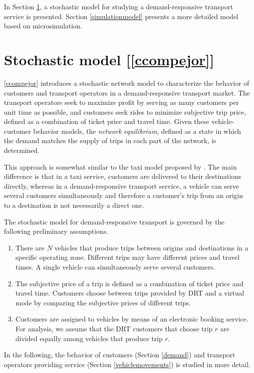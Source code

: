 \documentclass[dissertation,draft*]{aaltoseries}
\begin{document}
In Section \ref{networkmodel}, a stochastic model for studying a demand-responsive transport service is presented.
Section \ref{simulationmodel} presents a more detailed model based on microsimulation.

\section{Stochastic model [\ref{ccompejor}]}
\label{networkmodel}
\ref{ccompejor} introduces a stochastic network model to characterize the 
behavior of customers and transport operators in a demand-responsive transport market.
The transport operators seek to maximize profit by serving as many customers per unit time as possible, 
and customers seek rides to minimize subjective trip price, defined as a combination of ticket price and travel time. 
Given these vehicle-customer behavior models,
the \emph{network equilibrium}, defined as a state in which the demand matches the supply
of trips in each part of the network, is determined. 

This approach is somewhat similar to the taxi model proposed by \cite{yang2010}. The main difference is that in a taxi service, 
customers are delivered to their destinations directly, whereas in a demand-responsive transport service, a vehicle can serve several customers 
simultaneously and therefore a customer's trip from an origin to a destination is not necessarily a direct one. 

The stochastic model for demand-responsive transport is governed by the following preliminary assumptions.
\begin{enumerate}
\item
There are $N$ vehicles that produce trips between 
origins and destinations in a specific operating zone. 
Different trips may have different prices and
travel times. A single vehicle can simultaneously serve several customers.
\item
The subjective price of a trip is defined as a combination of ticket price and travel time.
Customers choose between trips provided by 
DRT and a virtual mode by comparing the subjective 
prices of different trips.
\item
Customers are assigned to vehicles by means of an electronic booking service.
For analysis, we assume that the DRT customers that 
choose trip $r$ are divided equally among vehicles that produce trip $r$. 
\end{enumerate} 
In the following, the behavior of customers (Section \ref{demand}) and transport operators providing service 
(Section \ref{vehiclemovements}) is studied in more detail.
\end{document}
